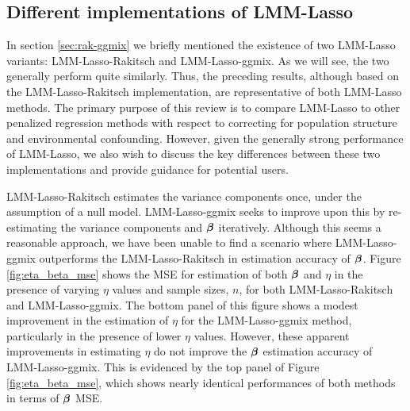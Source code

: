 \subsection{Different implementations of LMM-Lasso}

In section \ref{sec:rak-ggmix} we briefly mentioned the existence of two LMM-Lasso variants: LMM-Lasso-Rakitsch and LMM-Lasso-ggmix. As we will see, the two generally perform quite similarly. Thus, the preceding results, although based on the LMM-Lasso-Rakitsch implementation, are representative of both LMM-Lasso methods. The primary purpose of this review is to compare LMM-Lasso to other penalized regression methods with respect to correcting for population structure and environmental confounding. However, given the generally strong performance of LMM-Lasso, we also wish to discuss the key differences between these two implementations and provide guidance for potential users.

LMM-Lasso-Rakitsch estimates the variance components once, under the assumption of a null model. LMM-Lasso-ggmix seeks to improve upon this by re-estimating the variance components and $\boldsymbol{\beta}{}$ iteratively. Although this seems a reasonable approach, we have been unable to find a scenario where LMM-Lasso-ggmix outperforms the LMM-Lasso-Rakitsch in estimation accuracy of $\boldsymbol{\beta}{}$. Figure \ref{fig:eta_beta_mse} shows the MSE for estimation of both $\boldsymbol{\beta}{}$ and $\eta$ in the presence of varying $\eta$ values and sample sizes, $n$, for both LMM-Lasso-Rakitsch and LMM-Lasso-ggmix. The bottom panel of this figure shows a modest improvement in the estimation of $\eta$ for the LMM-Lasso-ggmix method, particularly in the presence of lower $\eta$ values. However, these apparent improvements in estimating $\eta$ do not improve the $\boldsymbol{\beta}{}$ estimation accuracy of LMM-Lasso-ggmix. This is evidenced by the top panel of Figure \ref{fig:eta_beta_mse}, which shows nearly identical performances of both methods in terms of $\boldsymbol{\beta}{}$ MSE. 

